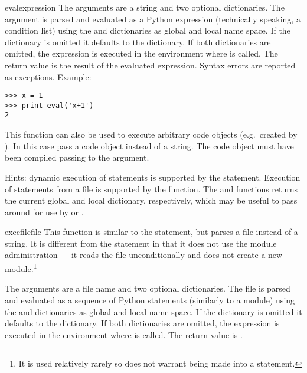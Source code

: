 \begin{funcdesc}{eval}{expression}
  The arguments are a string and two optional dictionaries.  The
   argument is parsed and evaluated as a Python
  expression (technically speaking, a condition list) using the
   and  dictionaries as global and local name
  space.  If the  dictionary is omitted it defaults to
  the  dictionary.  If both dictionaries are omitted, the
  expression is executed in the environment where  is
  called.  The return value is the result of the evaluated expression.
  Syntax errors are reported as exceptions.  Example:

\begin{verbatim}
>>> x = 1
>>> print eval('x+1')
2
\end{verbatim}

  This function can also be used to execute arbitrary code objects
  (e.g.\ created by ).  In this case pass a code
  object instead of a string.  The code object must have been compiled
  passing  to the  argument.

  Hints: dynamic execution of statements is supported by the
   statement.  Execution of statements from a file is
  supported by the  function.  The
   and  functions returns the
  current global and local dictionary, respectively, which may be
  useful to pass around for use by  or
  .
\end{funcdesc}

\begin{funcdesc}{execfile}{file}
  This function is similar to the
   statement, but parses a file instead of a string.  It
  is different from the  statement in that it does not
  use the module administration --- it reads the file unconditionally
  and does not create a new module.\footnote{It is used relatively
  rarely so does not warrant being made into a statement.}

  The arguments are a file name and two optional dictionaries.  The
  file is parsed and evaluated as a sequence of Python statements
  (similarly to a module) using the  and 
  dictionaries as global and local name space.  If the 
  dictionary is omitted it defaults to the  dictionary.
  If both dictionaries are omitted, the expression is executed in the
  environment where  is called.  The return value is
  .
\end{funcdesc}

